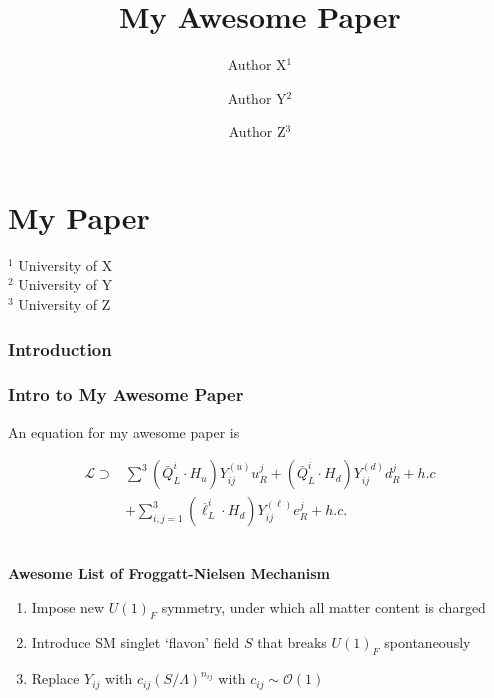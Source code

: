 \documentclass[usenames,dvipsnames, 8pt]{beamer}
\begin{document}
\title{My Awesome Paper}
\section{My Paper}
\author{\large Author X$^1$ \and Author Y$^2$ \and Author Z$^3$}
\date{}
\begin{frame}
\maketitle

\vspace{-2.5cm}

\begin{center}
{\small {}$^1$ University of X}\\
{\small {}$^2$ University of Y}\\
{\small {}$^3$ University of Z}
\end{center}
\end{frame}

\begin{frame}
\subsubsection{Introduction}
\frametitle{Intro to My Awesome Paper}

An equation for my awesome paper is

\begin{align*}
\mathcal{L} \supset &\sum^{3}\left(\bar{Q}_{L}^{i} \cdot H_{u}\right) Y^{(u)}_{ij} u_{R}^{j}+\left(\bar{Q}_{L}^{i} \cdot H_{d}\right) Y^{(d)}_{ij} d_{R}^{j}+h.c \nonumber \\
&+\sum_{i, j=1}^{3}\left(\overline{\ell}_{L}^{i} \cdot H_{d}\right)Y^{(\ell)}_{ij} e_{R}^{j}+h . c .
\end{align*}

\ \\[.5cm]

{\bf Awesome List of Froggatt-Nielsen Mechanism}\ \\[.3cm]
\begin{enumerate}
\item Impose new $U(1)_F$ symmetry, under which all matter content is charged
\item Introduce SM singlet `flavon' field $S$ that breaks $U(1)_F$ spontaneously 
\item Replace $Y_{ij}$ with $c_{ij}(S/\Lambda)^{n_{ij}}$ with $c_{ij}\sim \mathcal{O}(1)$
\end{enumerate}  

\ \\[.2cm]


\end{frame}
\end{document}
